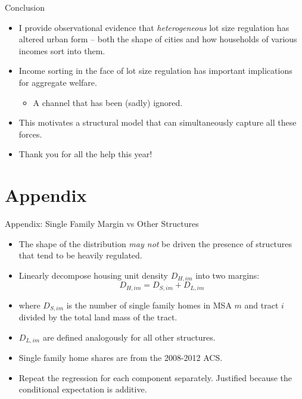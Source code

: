 \documentclass{beamer}
\theoremstyle{plain}
\begin{document}
\begin{frame}{Conclusion}
	\begin{itemize}
		\color{black}
		\itemsep1em
		
		\item I provide observational evidence that \textit{heterogeneous} lot size regulation has altered urban form -- both the shape of cities and how households of various incomes sort into them.
		
		\item Income sorting in the face of lot size regulation has important implications for aggregate welfare.
		
		\begin{itemize}
			\item A channel that has been (sadly) ignored. 
		\end{itemize}
		 
		
		\item This motivates a structural model that can simultaneously capture all these forces. 
		
		\item Thank you for all the help this year!
	\end{itemize}
\end{frame}


\section{Appendix}
\appendix
\begin{frame}{Appendix: Single Family Margin vs Other Structures}
\begin{itemize}
\color{black}
\item The shape of the distribution \textit{may not} be driven the presence of structures that tend to be heavily regulated. 
\item Linearly decompose housing unit density $D_{H, im}$ into two margins:
\begin{equation}
	D_{H, im} = D_{S, im} + D_{L, im}
\end{equation}
\item where $D_{S, im}$ is the number of single family homes in MSA $m$ and tract $i$ divided by the total land mass of the tract. 
\item $D_{L, im}$ are defined analogously for all other structures. 

\item Single family home shares are from the 2008-2012 ACS. 

\item \color{red} Repeat \color{black} the regression for each component separately. Justified because the conditional expectation is additive.
\end{itemize}
\end{frame}
\end{document}
